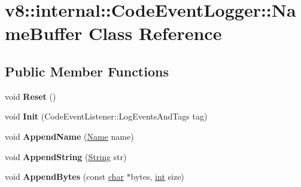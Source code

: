 \hypertarget{classv8_1_1internal_1_1CodeEventLogger_1_1NameBuffer}{}\section{v8\+:\+:internal\+:\+:Code\+Event\+Logger\+:\+:Name\+Buffer Class Reference}
\label{classv8_1_1internal_1_1CodeEventLogger_1_1NameBuffer}
\subsection*{Public Member Functions}
\begin{DoxyCompactItemize}
\item 
\mbox{\label{classv8_1_1internal_1_1CodeEventLogger_1_1NameBuffer_a2f4816566d8394a82560375ccea82bfa}} 
void {\bfseries Reset} ()
\item 
\mbox{\label{classv8_1_1internal_1_1CodeEventLogger_1_1NameBuffer_aa769c88dbf8d28c3116ac43cb9b24bf8}} 
void {\bfseries Init} (Code\+Event\+Listener\+::\+Log\+Events\+And\+Tags tag)
\item 
\mbox{\label{classv8_1_1internal_1_1CodeEventLogger_1_1NameBuffer_ade2532e398f473938fc1d086f1131726}} 
void {\bfseries Append\+Name} (\mbox{\hyperlink{classv8_1_1internal_1_1Name}{Name}} name)
\item 
\mbox{\label{classv8_1_1internal_1_1CodeEventLogger_1_1NameBuffer_a07f4e8613a46508f4570e7b49ca7ccc8}} 
void {\bfseries Append\+String} (\mbox{\hyperlink{classv8_1_1internal_1_1String}{String}} str)
\item 
\mbox{\label{classv8_1_1internal_1_1CodeEventLogger_1_1NameBuffer_afbbcc095e6a286550d3368e86bcdab2d}} 
void {\bfseries Append\+Bytes} (const \mbox{\hyperlink{classchar}{char}} $\ast$bytes, \mbox{\hyperlink{classint}{int}} size)
\item 
\mbox{\label{classv8_1_1internal_1_1CodeEventLogger_1_1NameBuffer_a5db4ff91339345c223d9f376f93ee4dc}} 

\end{DoxyCompactItemize}
